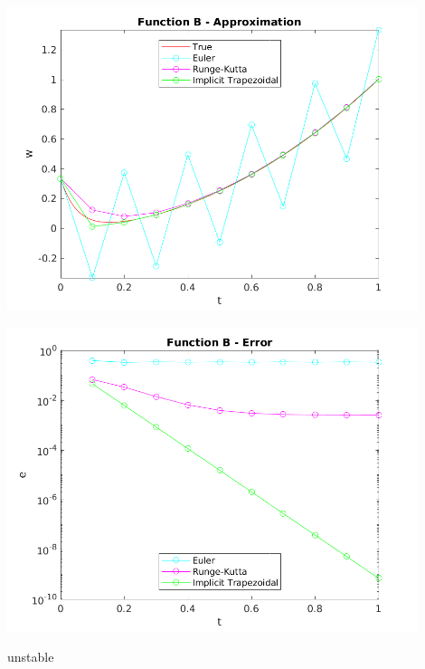 \documentclass{article}
\begin{document}
\begin{center}
  \includegraphics[width=0.9\textwidth]{../output/b_compare_val.png}
  \label{fig:a_compare_val}
\end{center}

\begin{center}
  \includegraphics[width=0.9\textwidth]{../output/b_compare_err.png}
  \label{fig:a_compare_err}
\end{center}



unstable
\end{document}
